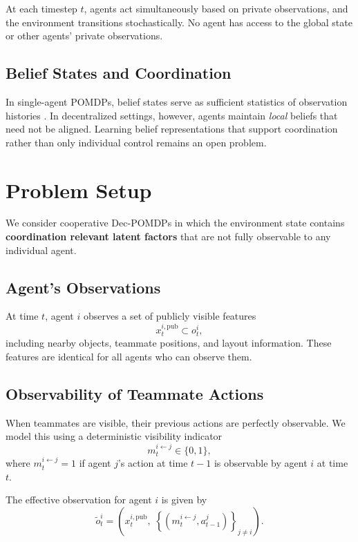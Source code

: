 \documentclass{article}
\theoremstyle{plain}
\theoremstyle{definition}
\theoremstyle{remark}
\begin{document}
At each timestep $t$, agents act simultaneously based on private observations, and the environment transitions stochastically. No agent has access to the global state or other agents’ private observations.

\subsection{Belief States and Coordination}

In single-agent POMDPs, belief states serve as sufficient statistics of observation histories \cite{kaelbling1998planning}. In decentralized settings, however, agents maintain \textit{local} beliefs that need not be aligned. Learning belief representations that support coordination rather than only individual control remains an open problem.

\section{Problem Setup}

We consider cooperative Dec-POMDPs in which the environment state contains \textbf{coordination relevant latent factors} that are not fully observable to any individual agent.

\subsection{Agent's Observations}

At time $t$, agent $i$ observes a set of publicly visible features
\begin{equation}
x_t^{i,\mathrm{pub}} \subset o_t^i,
\end{equation}
including nearby objects, teammate positions, and layout information. These features are identical for all agents who can observe them.

\subsection{Observability of Teammate Actions}
When teammates are visible, their previous actions are perfectly observable. We model this using a deterministic visibility indicator
\begin{equation}
m_t^{i \leftarrow j} \in \{0,1\},
\end{equation}
where $m_t^{i \leftarrow j} = 1$ if agent $j$'s action at time $t-1$ is observable by agent $i$ at time $t$.

The effective observation for agent $i$ is given by
\begin{equation}
\tilde{o}_t^i
=
\left(
x_t^{i,\mathrm{pub}},
\;
\left\{ (m_t^{i \leftarrow j}, a_{t-1}^j) \right\}_{j \neq i}
\right).
\end{equation}
\end{document}
